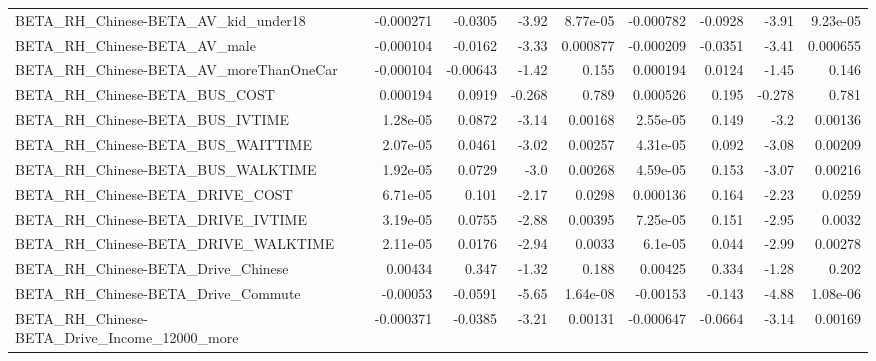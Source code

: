 \begin{tabular}{lrrrrrrrr}
BETA\_RH\_Chinese-BETA\_AV\_kid\_under18                &   -0.000271 &      -0.0305 &    -3.92 & 8.77e-05 &  -0.000782 &     -0.0928 &        -3.91 &      9.23e-05 \\
BETA\_RH\_Chinese-BETA\_AV\_male                       &   -0.000104 &      -0.0162 &    -3.33 & 0.000877 &  -0.000209 &     -0.0351 &        -3.41 &      0.000655 \\
BETA\_RH\_Chinese-BETA\_AV\_moreThanOneCar             &   -0.000104 &     -0.00643 &    -1.42 &    0.155 &   0.000194 &      0.0124 &        -1.45 &         0.146 \\
BETA\_RH\_Chinese-BETA\_BUS\_COST                      &    0.000194 &       0.0919 &   -0.268 &    0.789 &   0.000526 &       0.195 &       -0.278 &         0.781 \\
BETA\_RH\_Chinese-BETA\_BUS\_IVTIME                    &    1.28e-05 &       0.0872 &    -3.14 &  0.00168 &   2.55e-05 &       0.149 &         -3.2 &       0.00136 \\
BETA\_RH\_Chinese-BETA\_BUS\_WAITTIME                  &    2.07e-05 &       0.0461 &    -3.02 &  0.00257 &   4.31e-05 &       0.092 &        -3.08 &       0.00209 \\
BETA\_RH\_Chinese-BETA\_BUS\_WALKTIME                  &    1.92e-05 &       0.0729 &     -3.0 &  0.00268 &   4.59e-05 &       0.153 &        -3.07 &       0.00216 \\
BETA\_RH\_Chinese-BETA\_DRIVE\_COST                    &    6.71e-05 &        0.101 &    -2.17 &   0.0298 &   0.000136 &       0.164 &        -2.23 &        0.0259 \\
BETA\_RH\_Chinese-BETA\_DRIVE\_IVTIME                  &    3.19e-05 &       0.0755 &    -2.88 &  0.00395 &   7.25e-05 &       0.151 &        -2.95 &        0.0032 \\
BETA\_RH\_Chinese-BETA\_DRIVE\_WALKTIME                &    2.11e-05 &       0.0176 &    -2.94 &   0.0033 &    6.1e-05 &       0.044 &        -2.99 &       0.00278 \\
BETA\_RH\_Chinese-BETA\_Drive\_Chinese                 &     0.00434 &        0.347 &    -1.32 &    0.188 &    0.00425 &       0.334 &        -1.28 &         0.202 \\
BETA\_RH\_Chinese-BETA\_Drive\_Commute                 &    -0.00053 &      -0.0591 &    -5.65 & 1.64e-08 &   -0.00153 &      -0.143 &        -4.88 &      1.08e-06 \\
BETA\_RH\_Chinese-BETA\_Drive\_Income\_12000\_more       &   -0.000371 &      -0.0385 &    -3.21 &  0.00131 &  -0.000647 &     -0.0664 &        -3.14 &       0.00169 \\

\end{tabular}
